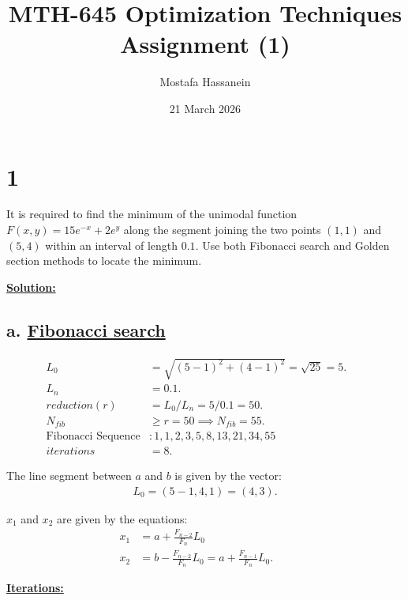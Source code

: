 \documentclass{article}
\author{Mostafa Hassanein}
\title{
  MTH-645 Optimization Techniques \\
  Assignment (1)}
\date{21 March 2026}
\begin{document}
\maketitle

\newpage

\section*{1}
It is required to find the minimum of the unimodal function $F(x,y) = 15 e^{-x} + 2e^{y}$ along the segment joining the two points $(1, 1)$ and $(5, 4)$ within an interval of length $0.1$. Use both Fibonacci search and Golden section methods to locate the minimum.

\begin{center}
  \textbf{\underline{Solution:}}  
\end{center}

\subsection*{a. \underline{Fibonacci search}}

\begin{align*}
 L_0 &= \sqrt{(5-1)^2 + (4-1)^2} = \sqrt{25} = 5. &&\\
 L_n &= 0.1. &&\\
 reduction (r) &= L_0 / L_n = 5/0.1 = 50. &&\\
 N_{fib} &\geq r = 50 \implies N_{fib} = 55. &&\\
 \text{Fibonacci Sequence}&: 1, 1, 2, 3, 5, 8, 13, 21, 34, 55 &&\\
 iterations &= 8.
\end{align*}

The line segment between $a$ and $b$ is given by the vector:
\begin{align*}
  L_0 = (5-1, 4,1) = (4,3).
\end{align*}

$x_1$ and $x_2$ are given by the equations:
\begin{align*}
  x_1 &= a + \frac{F_{n-2}}{F_{n}} L_0 &&\\
  x_2 &= b - \frac{F_{n-2}}{F_{n}} L_0 = a + \frac{F_{n-1}}{F_{n}} L_0.
\end{align*}

\textbf{\underline{Iterations:}}
\newline
\end{document}

